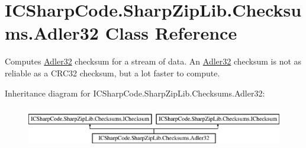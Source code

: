 \hypertarget{class_i_c_sharp_code_1_1_sharp_zip_lib_1_1_checksums_1_1_adler32}{}\section{I\+C\+Sharp\+Code.\+Sharp\+Zip\+Lib.\+Checksums.\+Adler32 Class Reference}
\label{class_i_c_sharp_code_1_1_sharp_zip_lib_1_1_checksums_1_1_adler32}


Computes \hyperlink{class_i_c_sharp_code_1_1_sharp_zip_lib_1_1_checksums_1_1_adler32}{Adler32} checksum for a stream of data. An \hyperlink{class_i_c_sharp_code_1_1_sharp_zip_lib_1_1_checksums_1_1_adler32}{Adler32} checksum is not as reliable as a C\+R\+C32 checksum, but a lot faster to compute.  


Inheritance diagram for I\+C\+Sharp\+Code.\+Sharp\+Zip\+Lib.\+Checksums.\+Adler32\+:\begin{figure}[H]
\begin{center}
\leavevmode
\includegraphics[height=1.848185cm]{class_i_c_sharp_code_1_1_sharp_zip_lib_1_1_checksums_1_1_adler32}
\end{center}
\end{figure}
